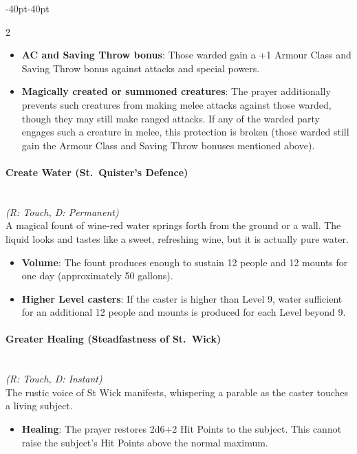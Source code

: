 \documentclass{book}
\providecommand{\tightlist}{%
\setlength{\itemsep}{0pt}\setlength{\parskip}{0pt}}
\begin{document}
\begin{adjustwidth}{-40pt}{-40pt}
\begin{multicols}{2}
\begin{itemize}
	\tightlist
	\item
	\textbf{AC and Saving Throw bonus}: Those warded gain a +1 Armour
	Class and Saving Throw bonus against attacks and special powers.
	\item
	\textbf{Magically created or summoned creatures}: The prayer
	additionally prevents such creatures from making melee attacks against
	those warded, though they may still make ranged attacks. If any of the
	warded party engages such a creature in melee, this protection is
	broken (those warded still gain the Armour Class and Saving Throw
	bonuses mentioned above).
\end{itemize}

\paragraph{Create Water (St.~Quister's
	Defence)}\label{create-water-st.-quisters-defence}\mbox{}\\
\emph{(R: Touch, D: Permanent)}\\
A magical fount of wine-red water springs forth from the ground or a
wall. The liquid looks and tastes like a sweet, refreshing wine, but it
is actually pure water.

\begin{itemize}
	\tightlist
	\item
	\textbf{Volume}: The fount produces enough to sustain 12 people and 12
	mounts for one day (approximately 50 gallons).
	\item
	\textbf{Higher Level casters}: If the caster is higher than Level 9,
	water sufficient for an additional 12 people and mounts is produced
	for each Level beyond 9.
\end{itemize}

\paragraph{Greater Healing (Steadfastness of
	St.~Wick)}\label{greater-healing-steadfastness-of-st.-wick}\mbox{}\\
\emph{(R: Touch, D: Instant)}\\
The rustic voice of St Wick manifests, whispering a parable as the
caster touches a living subject.

\begin{itemize}
	\tightlist
	\item
	\textbf{Healing}: The prayer restores 2d6+2 Hit Points to the subject.
	This cannot raise the subject's Hit Points above the normal maximum.
\end{itemize}


\end{multicols}
\end{adjustwidth}
\end{document}
